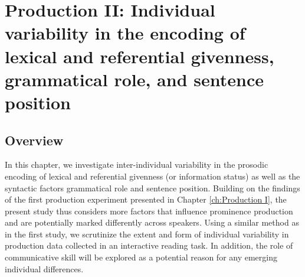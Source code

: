 \chapter{Production II: Individual variability in the encoding of lexical and referential givenness, grammatical role, and sentence position} \label{ch:Production II}

\section{Overview}

In this chapter, we investigate inter-individual variability in the prosodic encoding of lexical and referential givenness (or information status) as well as the syntactic factors grammatical role and sentence position. Building on the findings of the first production experiment presented in Chapter \ref{ch:Production I}, the present study thus considers more factors that influence prominence production and are potentially marked differently across speakers. Using a similar method as in the first study, we scrutinize the extent and form of individual variability in production data collected in an interactive reading task. In addition, the role of communicative skill will be explored as a potential reason for any emerging individual differences.


